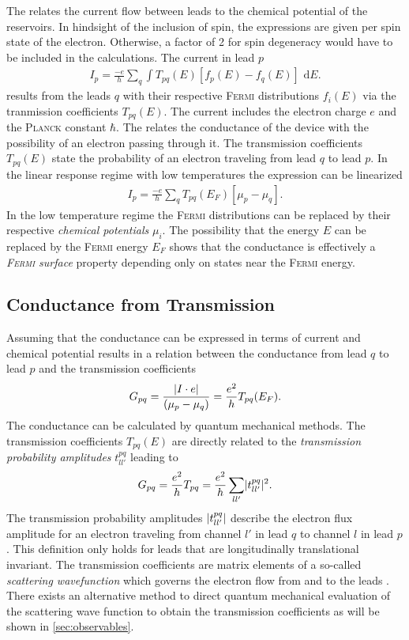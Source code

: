The \lanbform{} relates the current flow between leads to the chemical potential of the reservoirs. In hindsight of the inclusion of spin, the expressions are given per spin state of the electron. Otherwise, a factor of 2 for spin degeneracy would have to be included in the calculations. The current in lead $p$ \cite{PhysRevLett.68.2512}
\begin{align}
I_p=\frac{-e}{h} \sum_q \int T_{pq}(E) [f_p(E) - f_q(E)] \text{ d}E.
\label{eqn:current}
\end{align}
results from the leads $q$ with their respective \textsc{Fermi} distributions $f_i(E)$ via the tranmission coefficients $T_{pq}(E)$. The current includes the electron charge $e$ and the \textsc{Planck} constant $\hbar$. The \lanbform{} relates the conductance of the device with the possibility of an electron passing through it. The transmission coefficients $T_{pq}(E)$ state the probability of an electron traveling from lead $q$ to lead $p$. 
In the linear response regime with low temperatures the expression can be linearized 
\begin{align}
I_p=\frac{-e}{h} \sum_q T_{pq}(E_F) [\mu_p - \mu_q].
\label{eqn:currentlin}
\end{align}
In the low temperature regime the \textsc{Fermi} distributions can be replaced by their respective \emph{chemical potentials} $\mu_i$. The possibility that the energy $E$ can be replaced by the \textsc{Fermi} energy $E_F$ shows that the conductance is effectively a \emph{\textsc{Fermi} surface} property depending only on states near the \textsc{Fermi} energy.
\subsection{Conductance from Transmission}\label{sec:conductancefromtransmission}
Assuming that the conductance can be expressed in terms of current and chemical potential results in a relation between the conductance from lead $q$ to lead $p$ and the transmission coefficients 
\begin{align}
G_{pq}=\frac{\lvert I\cdot e\rvert}{(\mu_p - \mu_q)}=\frac{e^2}{h} T_{pq}(E_F).
\label{eqn:conductance}
\end{align}
The conductance can be calculated by quantum mechanical methods. The transmission coefficients $T_{pq}(E)$ are directly related to the \emph{transmission probability amplitudes} $t^{pq}_{ll'}$ leading to
\begin{align}
G_{pq}=\frac{e^2}{h} T_{pq} =\frac{e^2}{h} \sum_{ll'} \lvert t^{pq}_{ll'}\rvert^2.
\label{eqn:transcoeff}
\end{align}
The transmission probability amplitudes $\lvert t^{pq}_{ll'}\rvert$ describe the electron flux amplitude for an electron traveling from channel $l'$ in lead $q$ to channel $l$ in lead $p$. This definition only holds for leads that are longitudinally translational invariant. The transmission coefficients are matrix elements of a so-called \emph{scattering wavefunction} which governs the electron flow from and to the leads \cite{Datta1997}. There exists an alternative method to direct quantum mechanical evaluation of the scattering wave function to obtain the transmission coefficients as will be shown in \cref{sec:observables}.
